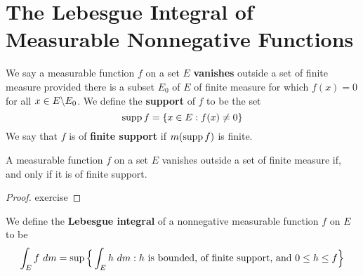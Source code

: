 \section{The Lebesgue Integral of Measurable Nonnegative Functions}

\begin{definition}
    We say a measurable function $f$ on a set $E$ \textbf{vanishes} outside a
    set of finite measure provided there is a subset $E_0$ of $E$ of finite
    measure for which $f(x)=0$ for all $x \in E \backslash E_0$. We define the
    \textbf{support} of $f$ to be the set
    \begin{equation*}
        \operatorname{supp}{f}=\{x \in E : f(x) \neq 0\}
    \end{equation*}
    We say that $f$ is of  \textbf{finite support} if $m(\operatorname{supp}{f})$ is finite.
\end{definition}

\begin{lemma}\label{10.2.1}
    A measurable function $f$ on a set $E$ vanishes outside a set of finite
    measure if, and only if it is of finite support.
\end{lemma}
\begin{proof}
    exercise
\end{proof}

\begin{definition}
    We define the \textbf{Lebesgue integral} of a nonnegative measurable
    function $f$ on $E$ to be
    \begin{equation*}
        \int_E{f \ dm}=
        \sup{\Big{\{} \int_E{h \ dm} : h \text{ is bounded, of finite support,
        and } 0 \leq h \leq f \Big{\}}}
    \end{equation*}
\end{definition}

